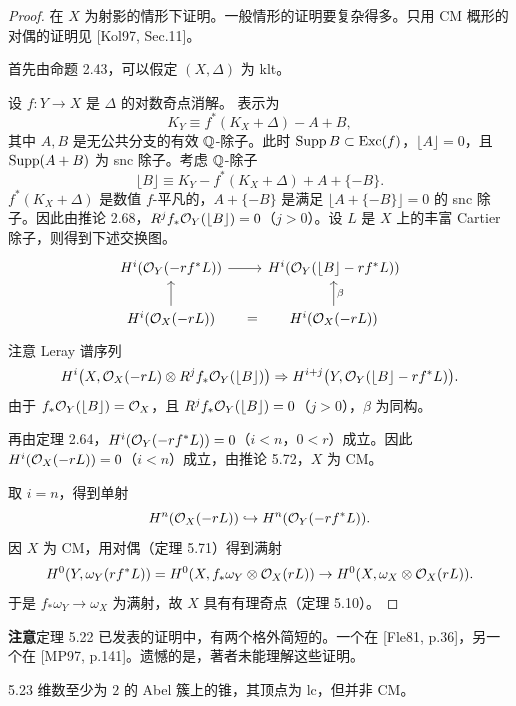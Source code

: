 \begin{proof}
在 $X$ 为射影的情形下证明。一般情形的证明要复杂得多。只用 CM 概形的对偶的证明见 [Kol97, Sec.11]。

首先由命题 2.43，可以假定 $(X,\Delta)$ 为 klt。

设 $f\colon Y\to X$ 是 $\Delta$ 的对数奇点消解。
表示为
\[
K_Y\equiv f^*(K_X+\Delta)-A+B,
\]
其中 $A,B$ 是无公共分支的有效 $\mathbb{Q}$-除子。此时 $\operatorname{Supp} B\subset\operatorname{Exc}(f)$，$\lfloor A\rfloor=0$，且 $\operatorname{Supp}(A+B)$ 为 snc 除子。考虑 $\mathbb{Q}$-除子
\[
\lfloor B\rfloor\equiv K_Y-f^*(K_X+\Delta)+A+\{-B\}.
\]
$f^*(K_X+\Delta)$ 是数值 $f$-平凡的，$A+\{-B\}$ 是满足 $\lfloor A+\{-B\}\rfloor=0$ 的 snc 除子。因此由推论 2.68，$R^jf_*\mathcal{O}_Y(\lfloor B\rfloor)=0$（$j>0$）。设 $L$ 是 $X$ 上的丰富 Cartier 除子，则得到下述交换图。
\[
\begin{tikzcd}
H^i(\cO_Y(-rf^*L)) \arrow[r] & H^i(\cO_Y(\lfloor B\rfloor-rf^*L)) \\
H^i(\cO_X(-rL)) \arrow[u] \arrow[r,phantom,"="] & H^i(\cO_X(-rL)) \arrow[u,"\beta"']
\end{tikzcd}
\]
注意 Leray 谱序列
\[
H^i\bigl(X,\mathcal{O}_X(-rL)\otimes R^jf_*\mathcal{O}_Y(\lfloor B\rfloor)\bigr)\Rightarrow H^{i+j}\bigl(Y,\mathcal{O}_Y(\lfloor B\rfloor-rf^*L)\bigr).
\]
由于 $f_*\mathcal{O}_Y(\lfloor B\rfloor)=\mathcal{O}_X$，且 $R^jf_*\mathcal{O}_Y(\lfloor B\rfloor)=0$（$j>0$），$\beta$ 为同构。

再由定理 2.64，$H^i(\mathcal{O}_Y(-rf^*L))=0$（$i<n$，$0<r$）成立。因此 $H^i(\mathcal{O}_X(-rL))=0$（$i<n$）成立，由推论 5.72，$X$ 为 CM。

取 $i=n$，得到单射
\[
H^n(\mathcal{O}_X(-rL))\hookrightarrow H^n(\mathcal{O}_Y(-rf^*L)).
\]
因 $X$ 为 CM，用对偶（定理 5.71）得到满射
\[
H^0(Y,\omega_Y(rf^*L))=H^0(X,f_*\omega_Y\otimes\mathcal{O}_X(rL))\to H^0(X,\omega_X\otimes\mathcal{O}_X(rL)).
\]
于是 $f_*\omega_Y\to\omega_X$ 为满射，故 $X$ 具有有理奇点（定理 5.10）。
\end{proof}


\par\medskip\noindent\textbf{注意}\quad 定理 5.22 已发表的证明中，有两个格外简短的。一个在 [Fle81, p.36]，另一个在 [MP97, p.141]。遗憾的是，著者未能理解这些证明。

\begin{example}{5.23}
维数至少为 $2$ 的 Abel 簇上的锥，其顶点为 lc，但并非 CM。
\end{example}

